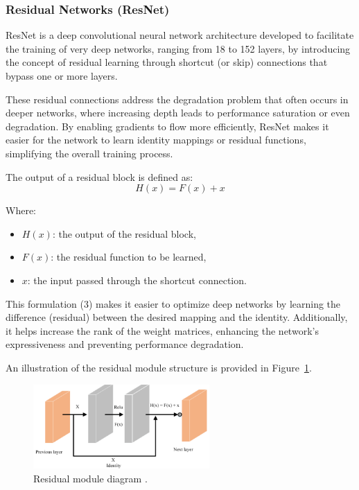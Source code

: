 \subsubsection{Residual Networks (ResNet)}
ResNet is a deep convolutional neural network architecture developed to facilitate the training of very deep networks, ranging from 18 to 152 layers, by introducing the concept of residual learning through shortcut (or skip) connections that bypass one or more layers.

These residual connections address the degradation problem that often occurs in deeper networks, where increasing depth leads to performance saturation or even degradation. By enabling gradients to flow more efficiently, ResNet makes it easier for the network to learn identity mappings or residual functions, simplifying the overall training process.

The output of a residual block is defined as:
\begin{equation}
    H(x) = F(x) + x  \tag{3}
\end{equation}

Where:
\begin{itemize}
    \item $H(x)$: the output of the residual block,
    \item $F(x)$: the residual function to be learned,
    \item $x$: the input passed through the shortcut connection.
\end{itemize}

This formulation (3) makes it easier to optimize deep networks by learning the difference (residual) between the desired mapping and the identity. Additionally, it helps increase the rank of the weight matrices, enhancing the network’s expressiveness and preventing performance degradation.

An illustration of the residual module structure is provided in Figure~\ref{fig:figure11}.


\begin{figure}[H] %
    \centering
    \includegraphics[width=0.6\textwidth]{chapters/chapter1/images/Figure11.png}
    \caption{Residual module diagram \parencite{fang2023lightweight}.}
    \label{fig:figure11}
\end{figure}

